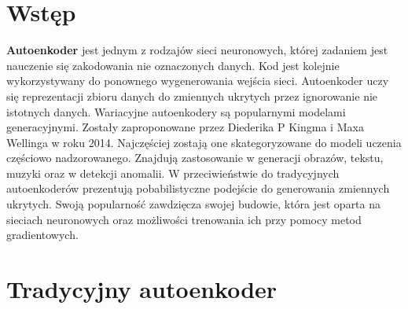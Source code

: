 \documentclass[a4paper,12pt]{book} %
\begin{document}
\sloppy



\thispagestyle{empty}




\tableofcontents{}

\chapter*{Wstęp} %
\textbf{Autoenkoder} jest jednym z rodzajów sieci neuronowych, której zadaniem jest nauczenie się zakodowania nie oznaczonych danych. Kod jest kolejnie wykorzystywany do ponownego wygenerowania wejścia sieci. Autoenkoder uczy się reprezentacji zbioru danych do zmiennych ukrytych przez ignorowanie nie istotnych danych.
Wariacyjne autoenkodery są popularnymi modelami generacyjnymi. Zostały zaproponowane przez Diederika P Kingma i Maxa Wellinga w roku 2014.\cite{kingma2014autoencoding} Najczęściej zostają one skategoryzowane do modeli uczenia częściowo nadzorowanego. Znajdują zastosowanie w generacji obrazów, tekstu, muzyki oraz w detekcji anomalii. W przeciwieństwie do tradycyjnych autoenkoderów prezentują pobabilistyczne podejście do generowania zmiennych ukrytych. Swoją popularność zawdzięcza swojej budowie, która jest oparta na sieciach neuronowych oraz możliwości trenowania ich przy pomocy metod gradientowych.
\chapter{Tradycyjny autoenkoder} 
\end{document}
